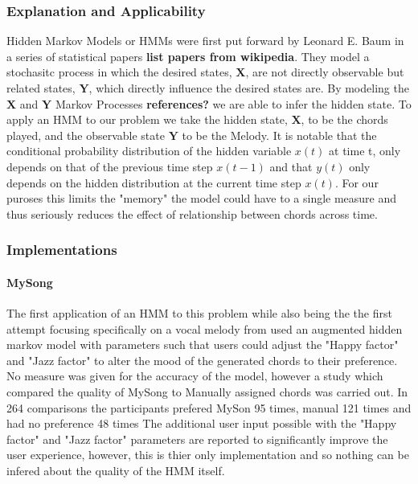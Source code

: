 \subsubsection{Explanation and Applicability}
Hidden Markov Models or HMMs were first put forward by Leonard E. Baum in a series of statistical papers \textbf{list papers from wikipedia}. 
They model a stochasitc process in which the desired states, $\boldsymbol{X}$, are not directly observable but related states, $\boldsymbol{Y}$, which directly influence the desired states are. 
By modeling the $\boldsymbol{X}$ and $\boldsymbol{Y}$ Markov Processes \textbf{references?} we are able to infer the hidden state.
To apply an HMM to our problem we take the hidden state, $\boldsymbol{X}$, to be the chords played, and the observable state $\boldsymbol{Y}$ to be the Melody.
It is notable that the conditional probability distribution of the hidden variable $x(t)$ at time t, only depends on that of the previous time step $x(t-1)$ and that $y(t)$ only depends on the hidden distribution at the current time step $x(t)$.
For our puroses this limits the "memory" the model could have to a single measure and thus seriously reduces the effect of relationship between chords across time.

\subsubsection{Implementations}

\paragraph{MySong} The first application of an HMM to this problem while also being the the first attempt focusing specifically on a vocal melody from \cite{MySong} used an augmented hidden markov model with parameters such that users could adjust the "Happy factor" and "Jazz factor" to alter the mood of the generated chords to their preference.
No measure was given for the accuracy of the model, however a study which compared the quality of MySong to Manually assigned chords was carried out. 
In 264 comparisons the participants prefered MySon 95 times, manual 121 times and had no preference 48 times
The additional user input possible with the "Happy factor" and "Jazz factor" parameters are reported to significantly improve the user experience, however, this is thier only implementation and so nothing can be infered about the quality of the HMM itself.

